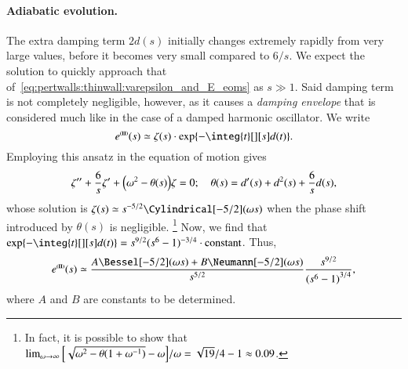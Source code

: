     \paragraph{Adiabatic evolution.} %
    The extra damping term $2d(s)$ initially changes extremely rapidly from very large values, before it becomes very small compared to $6/s$. We expect the solution to quickly approach that of~\cref{eq:pertwalls:thinwall:varepsilon_and_E_eoms} as $s\gg 1$. 
    Said damping term is not completely negligible, however, as it causes a \emph{damping envelope} that is considered much like in the case of a damped harmonic oscillator. We write
    \begin{equation}\label{eq:pertwalls:mywalls:eps_s_II_MD_w}
        e^{\text{\eqregimenum{II}}}(s) \simeq   \zeta(s) \cdot \exp{ - \integ{t}[][s] d(t) }.%
    \end{equation}
    Employing this ansatz in the equation of motion gives
    \begin{equation}
        \zeta'' + \frac{6}{s} \zeta' + {\left( \omega^2 - \theta(s)  \right)} \zeta= 0; \quad \theta(s) = d'(s) + d^2(s) + \frac{6}{s}d (s),
    \end{equation}
    whose solution is $\zeta(s) \simeq s^{-5/2}\Cylindrical[-5/2](\omega s)$ %
    when the phase shift introduced by $\theta(s)$ is negligible.%
    {\footnote{In fact, it is possible to show that $\lim_{\omega\to \infty}{{\left[ \sqrt{\omega^2-\theta(1+\omega^{-1})}-\omega \right]} /\omega }= \sqrt{19}/4 -1 \approx 0.09$.}} %
    Now, we find that $\exp{-\integ{t}[][s] d(t)} =s^{9/2} (s^6-1)^{-3/4}  \cdot \text{constant}$. Thus,
    \begin{equation}\label{eq:pertwalls:mywalls:eps_s_II_MD}
        e^{\text{\eqregimenum{II}}}(s) \simeq \frac{ A \Bessel[-5/2](\omega s) + B \Neumann[-5/2](\omega s) }{s^{5/2}} \frac{s^{9/2}}{{(s^6-1)}^{3/4}},
    \end{equation}
    where $A$ and $B$ are constants to be determined.

